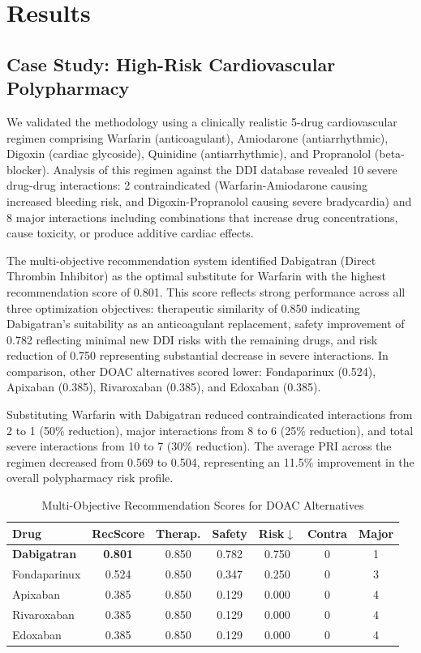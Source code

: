 \documentclass[11pt,a4paper]{article}
\begin{document}
\section*{Results}

\subsection*{Case Study: High-Risk Cardiovascular Polypharmacy}

We validated the methodology using a clinically realistic 5-drug cardiovascular regimen comprising Warfarin (anticoagulant), Amiodarone (antiarrhythmic), Digoxin (cardiac glycoside), Quinidine (antiarrhythmic), and Propranolol (beta-blocker). Analysis of this regimen against the DDI database revealed 10 severe drug-drug interactions: 2 contraindicated (Warfarin-Amiodarone causing increased bleeding risk, and Digoxin-Propranolol causing severe bradycardia) and 8 major interactions including combinations that increase drug concentrations, cause toxicity, or produce additive cardiac effects.

The multi-objective recommendation system identified Dabigatran (Direct Thrombin Inhibitor) as the optimal substitute for Warfarin with the highest recommendation score of 0.801. This score reflects strong performance across all three optimization objectives: therapeutic similarity of 0.850 indicating Dabigatran's suitability as an anticoagulant replacement, safety improvement of 0.782 reflecting minimal new DDI risks with the remaining drugs, and risk reduction of 0.750 representing substantial decrease in severe interactions. In comparison, other DOAC alternatives scored lower: Fondaparinux (0.524), Apixaban (0.385), Rivaroxaban (0.385), and Edoxaban (0.385).

Substituting Warfarin with Dabigatran reduced contraindicated interactions from 2 to 1 (50\% reduction), major interactions from 8 to 6 (25\% reduction), and total severe interactions from 10 to 7 (30\% reduction). The average PRI across the regimen decreased from 0.569 to 0.504, representing an 11.5\% improvement in the overall polypharmacy risk profile.

\begin{table}[H]
\centering
\caption{Multi-Objective Recommendation Scores for DOAC Alternatives}
\label{tab:doac_alternatives}
\begin{tabular}{@{}lcccccc@{}}
\toprule
\textbf{Drug} & \textbf{RecScore} & \textbf{Therap.} & \textbf{Safety} & \textbf{Risk$\downarrow$} & \textbf{Contra} & \textbf{Major} \\
\midrule
\textbf{Dabigatran} & \textbf{0.801} & 0.850 & 0.782 & 0.750 & 0 & 1 \\
Fondaparinux & 0.524 & 0.850 & 0.347 & 0.250 & 0 & 3 \\
Apixaban & 0.385 & 0.850 & 0.129 & 0.000 & 0 & 4 \\
Rivaroxaban & 0.385 & 0.850 & 0.129 & 0.000 & 0 & 4 \\
Edoxaban & 0.385 & 0.850 & 0.129 & 0.000 & 0 & 4 \\
\bottomrule
\end{tabular}
\end{table}
\end{document}

